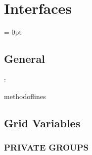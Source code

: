 \section{Interfaces} 


\parskip = 0pt

\vspace{3mm} \subsection*{General}

: 

methodoflines
\vspace{2mm}
\subsection*{Grid Variables}
\vspace{5mm}\subsubsection{PRIVATE GROUPS}

\vspace{5mm}

